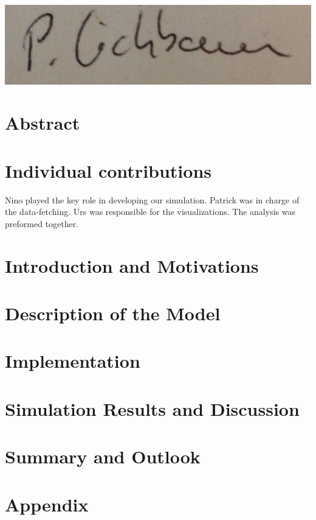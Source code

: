 \documentclass[11pt]{article}
\begin{document}
\begin{minipage}{0.33\textwidth}
\includegraphics[scale=0.13]{patrick.png}
\end{minipage}

\clearpage

\tableofcontents

\newpage




\section{Abstract}



\section{Individual contributions}


Nino played the key role in developing our simulation. Patrick was in charge of the data-fetching. Urs was responsible for the visualizations. The analysis was preformed together. 

\section{Introduction and Motivations}



\section{Description of the Model}




\section{Implementation}







\section{Simulation Results and Discussion}



\section{Summary and Outlook}



\section{Appendix}



\end{document}
